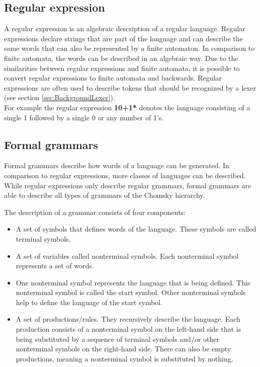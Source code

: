 \subsection{Regular expression}\label{sec:BackgroundRegEx}

A regular expression is an algebraic description of a regular language.
Regular expressions declare strings that are part of the language and can describe the same words that can also be represented by a finite automaton. 
In comparison to finite automata, the words can be described in an algebraic way. 
Due to the similarities between regular expressions and finite automata, it is possible to convert regular expressions to finite automata and backwards. 
Regular expressions are often used to describe tokens that should be recognized by a lexer (see section \ref{sec:BackgroundLexer}). \cite{AutomataTheory.2007}\\
For example the regular expression \textbf{10+1*} denotes the language consisting of a single 1 followed by a single 0 or any number of 1's. 

\subsection{Formal grammars}\label{sec:BackgroundGrammar}

Formal grammars describe how words of a language can be generated. In comparison to regular expressions, more classes of languages can be described. While regular expressions only describe regular grammars, formal grammars are able to describe all types of grammars of the Chomsky hierarchy.


The description of a grammar consists of four components:

\begin{itemize}

\item A set of symbols that defines words of the language. These symbols are called terminal symbols.

\item A set of variables called nonterminal symbols. Each nonterminal symbol represents a set of words. 

\item One nonterminal symbol represents the language that is being defined. This nonterminal symbol is called the start symbol. Other nonterminal symbols help to define the language of the start symbol.

\item A set of productions/rules. They recursively describe the language. Each production consists of a nonterminal symbol on the left-hand side that is being substituted by a sequence of terminal symbols and/or other nonterminal symbols on the right-hand side.
There can also be empty productions, meaning a nonterminal symbol is substituted by nothing.
\end{itemize}

